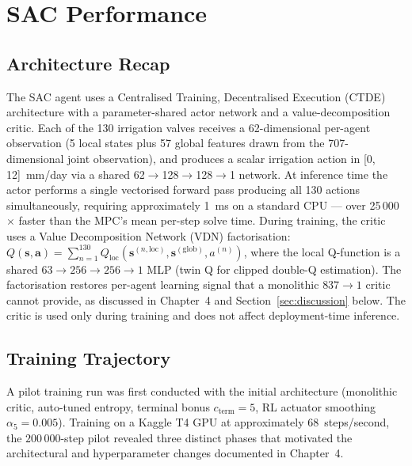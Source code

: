 \section{SAC Performance}
\label{sec:sac}

\subsection{Architecture Recap}

The SAC agent uses a Centralised Training, Decentralised Execution (CTDE) architecture
with a parameter-shared actor network and a value-decomposition critic.
Each of the 130 irrigation valves receives a
62-dimensional per-agent observation (5 local states plus 57 global features drawn from
the 707-dimensional joint observation), and produces a scalar irrigation action in
[0, 12]~mm/day via a shared 62$\to$128$\to$128$\to$1 network.
At inference time the actor performs a single vectorised forward pass producing all 130
actions simultaneously, requiring approximately 1~ms on a standard CPU — over
25\,000$\times$ faster than the MPC's mean per-step solve time.
During training, the critic uses a Value Decomposition Network (VDN) factorisation:
$Q(\mathbf{s},\mathbf{a}) = \sum_{n=1}^{130} Q_{\mathrm{loc}}(\mathbf{s}^{(n,\mathrm{loc})},
\mathbf{s}^{(\mathrm{glob})}, a^{(n)})$, where the local Q-function is a shared
$63 \to 256 \to 256 \to 1$ MLP (twin Q for clipped double-Q estimation). The
factorisation restores per-agent learning signal that a monolithic $837 \to 1$ critic
cannot provide, as discussed in Chapter~4 and Section~\ref{sec:discussion} below.
The critic is used only during training and does not affect deployment-time inference.

\subsection{Training Trajectory}

A pilot training run was first conducted with the initial architecture (monolithic critic,
auto-tuned entropy, terminal bonus $c_{\mathrm{term}} = 5$, RL actuator smoothing
$\alpha_5 = 0.005$).  Training on a Kaggle T4 GPU at approximately 68~steps/second, the
$200\,000$-step pilot revealed three distinct phases that motivated the architectural and
hyperparameter changes documented in Chapter~4.

